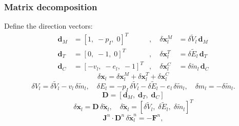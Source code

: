 \subsubsection{Matrix decomposition}
Define the direction vectors:
\begin{align}
\boldsymbol{d}_M &= [1,\; -p_I,\; 0]^T&, \quad \delta{\boldsymbol{x}}_l^M &= \delta\tilde{V}_l\, \boldsymbol{d}_M\\
\boldsymbol{d}_T &= [0,\; -1,\; 0]^T&, \quad \delta{\boldsymbol{x}}_l^T &= \delta\tilde{E}_l\, \boldsymbol{d}_T\\
\boldsymbol{d}_C &= [-v_l,\; -e_l,\; -1]^T&, \quad \delta{\boldsymbol{x}}_l^C &= \delta\tilde{m}_l\, \boldsymbol{d}_C
\end{align}
\begin{equation}
\delta{\boldsymbol{x}}_l = \delta{\boldsymbol{x}}_l^M + \delta{\boldsymbol{x}}_l^T + \delta{\boldsymbol{x}}_l^C
\end{equation}
\begin{equation}
\delta V_l = \delta\tilde{V}_l - v_l \, \delta\tilde{m}_l, \quad \delta E_l = -p_I\,\delta\tilde{V}_l-\delta\tilde{E}_l-e_l\,\delta\tilde{m}_l, \quad \delta m_l = -\delta\tilde{m}_l.
\end{equation}
\begin{equation}
\boldsymbol{D} = \left[\boldsymbol{d}_M,\; \boldsymbol{d}_T,\; \boldsymbol{d}_C\right]
\end{equation}
\begin{equation}
\delta{\boldsymbol{x}}_l = \boldsymbol{D} \, \delta\tilde{\boldsymbol{x}}_l, \quad \delta\tilde{\boldsymbol{x}}_l=\left[\delta\tilde{V}_l,\;\delta\tilde{E}_l,\;\delta\tilde{m}_l\right]^T
\end{equation}
\begin{equation}\label{newton_D}
\boldsymbol{J}^n \cdot \boldsymbol{D}^n \, \delta\tilde{\boldsymbol{x}}_l^n = - \boldsymbol{F}^n,
\end{equation}
